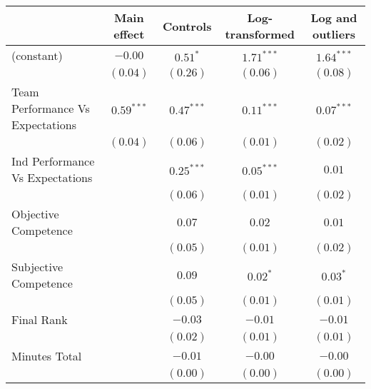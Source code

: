 
\begin{table}
\begin{center}
\begin{tabular}{l c c c c }
\toprule
 & Main effect & Controls & Log-transformed & Log and outliers \\
\midrule
(constant)                        & $-0.00$               & $\mathbf{0.51}^{*}$   & $\mathbf{1.71}^{***}$ & $\mathbf{1.64}^{***}$ \\
                                  & $(0.04)$              & $(0.26)$              & $(0.06)$              & $(0.08)$              \\
Team Performance Vs Expectations  & $\mathbf{0.59}^{***}$ & $\mathbf{0.47}^{***}$ & $\mathbf{0.11}^{***}$ & $\mathbf{0.07}^{***}$ \\
                                  & $(0.04)$              & $(0.06)$              & $(0.01)$              & $(0.02)$              \\
Ind Performance Vs Expectations   &                       & $\mathbf{0.25}^{***}$ & $\mathbf{0.05}^{***}$ & $0.01$                \\
                                  &                       & $(0.06)$              & $(0.01)$              & $(0.02)$              \\
Objective Competence              &                       & $0.07$                & $0.02$                & $0.01$                \\
                                  &                       & $(0.05)$              & $(0.01)$              & $(0.02)$              \\
Subjective Competence             &                       & $0.09$                & $\mathbf{0.02}^{*}$   & $\mathbf{0.03}^{*}$   \\
                                  &                       & $(0.05)$              & $(0.01)$              & $(0.01)$              \\
Final Rank                        &                       & $-0.03$               & $-0.01$               & $-0.01$               \\
                                  &                       & $(0.02)$              & $(0.01)$              & $(0.01)$              \\
Minutes Total                   &                       & $-0.01$  & $-0.00$  & $-0.00$               \\
                                  &                       & $(0.00)$              & $(0.00)$              & $(0.00)$              \\

\end{tabular}
\end{center}
\end{table}
